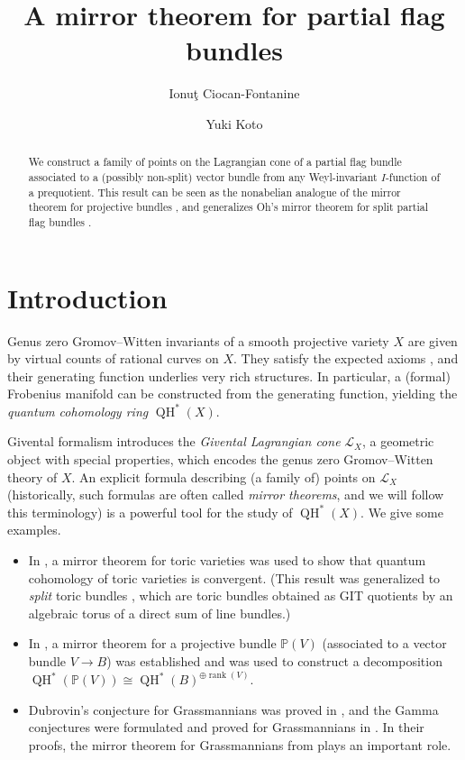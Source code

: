 \documentclass[a4paper,12pt]{amsart}
\title{A mirror theorem for partial flag bundles}
\author{Ionu\c t Ciocan-Fontanine}
\author{Yuki Koto}
\numberwithin{equation}{section}
\theoremstyle{definition}
\newcommand{\PP}{\mathbb{P}}
\newcommand{\cL}{\mathcal{L}}
\newcommand{\rank}{\operatorname{rank}}
\newcommand{\QH}{\operatorname{QH}}
\begin{document}
\begin{abstract}
    We construct a family of points on the Lagrangian cone of a partial flag bundle associated to a (possibly non-split) vector bundle from any Weyl-invariant $I$-function of a prequotient.
    This result can be seen as the nonabelian analogue of the mirror theorem for projective bundles \cite{IK:quantum}, and generalizes Oh's mirror theorem for split partial flag bundles \cite{Oh:split_flag_bundle}.
    
\end{abstract}

\maketitle

\tableofcontents

\section{Introduction}


Genus zero Gromov--Witten invariants of a smooth projective variety $X$ are given by virtual counts of rational curves on $X$.
They satisfy the expected axioms \cite{KM,Behrend}, and their generating function underlies very rich structures.
In particular, a (formal) Frobenius manifold can be constructed from the generating function, yielding the \emph{quantum cohomology ring} $\QH^*(X)$.

Givental formalism \cite{Givental:symplectic} introduces the \emph{Givental Lagrangian cone} $\cL_X$, a geometric object with special properties, which encodes the genus zero Gromov--Witten theory of $X$. 
An explicit formula describing (a family of) points on $\cL_X$ (historically, such formulas are often called  \emph{mirror theorems}, and we will follow this terminology) is a powerful tool for the study of $\QH^*(X)$.
We give some examples.
\begin{itemize}
    \item 
    In \cite{Iritani:convergence}, a mirror theorem for toric varieties was used to show that quantum cohomology of toric varieties is convergent.
    (This result was generalized to \emph{split} toric bundles \cite{Koto:convergence}, which are toric bundles obtained as GIT quotients by an algebraic torus of a direct sum of line bundles.)
    \item 
    In \cite{IK:quantum}, a mirror theorem for a projective bundle $\PP(V)$ (associated to a vector bundle $V\to B$) was established and was used to construct a decomposition $\QH^*(\PP(V))\cong \QH^*(B)^{\oplus\rank(V)}$. 
    \item 
    Dubrovin's conjecture \cite{Dubrovin:geometry} for Grassmannians was proved in \cite{Ueda:Dubrovin_Grassmannians}, and the Gamma conjectures were formulated and proved for Grassmannians in \cite{GGI}.
    In their proofs, the mirror theorem for Grassmannians from \cite{BCFK:two} plays an important role.
\end{itemize}
\end{document}
